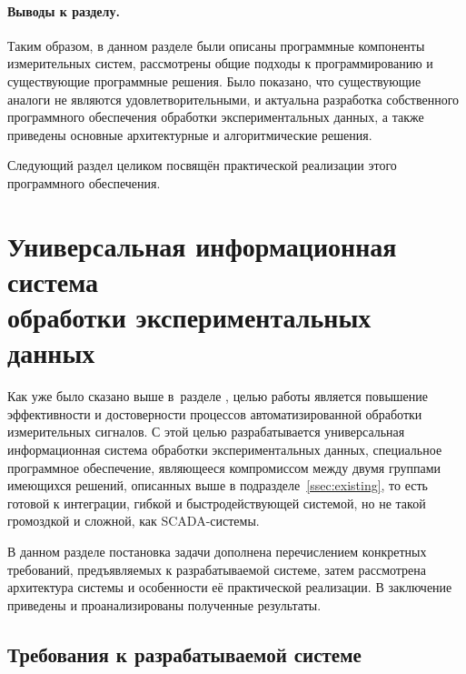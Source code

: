 \documentclass[a4paper, 14pt, titlepage]{extarticle}
\let\oldsection\section
\renewcommand{\section}{\newpage\oldsection}
\let\oldparagraph\paragraph
\renewcommand{\paragraph}[1]{\oldparagraph{\indent #1}}
\begin{document}
  \paragraph{Выводы к разделу.}
  Таким образом, в данном разделе были описаны программные компоненты измерительных систем,
  рассмотрены общие подходы к программированию и существующие программные решения. Было показано,
  что существующие аналоги не являются удовлетворительными, и актуальна разработка собственного
  программного обеспечения обработки экспериментальных данных, а также приведены основные
  архитектурные и алгоритмические решения.

  Следующий раздел целиком посвящён практической реализации этого программного обеспечения.

  \section[Универсальная информационная система обработки экспериментальных данных]%
          {Универсальная информационная система\\обработки экспериментальных данных}\label{sec:my-system}

  Как уже было сказано выше в~разделе ,
  целью работы является повышение эффективности и достоверности процессов автоматизированной
  обработки измерительных сигналов. С этой целью разрабатывается универсальная информационная
  система обработки экспериментальных данных,
  специальное программное обеспечение,
  являющееся компромиссом между двумя группами имеющихся решений, описанных выше в
  подразделе~\ref{ssec:existing}, то есть готовой к интеграции, гибкой и быстродействующей системой, но не такой
  громоздкой и сложной, как SCADA-системы.

  В данном разделе постановка задачи дополнена перечислением конкретных требований, предъявляемых к
  разрабатываемой системе, затем рассмотрена архитектура системы и особенности её практической
  реализации. В заключение приведены и проанализированы полученные результаты.


  \subsection{Требования к разрабатываемой системе}\label{ssec:requirements}
\end{document}
